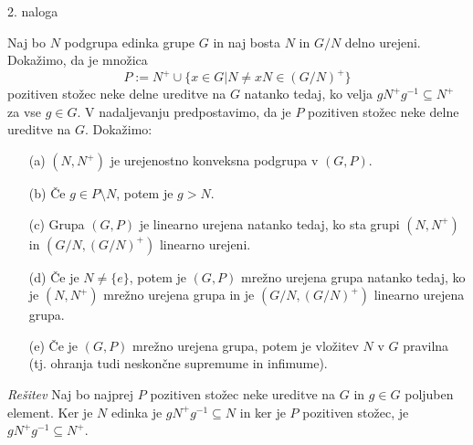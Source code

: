 \documentclass[a4paper, 12pt]{article}
\begin{document}
\begin{flushleft}
2. naloga
\end{flushleft}
Naj bo $N$ podgrupa edinka grupe $G$ in naj bosta $N$ in $G/N$ delno urejeni. Dokažimo, da je množica 
$$
P:= N^+ \cup \{x\in G | N \neq xN \in (G/N)^+ \}
$$
pozitiven stožec neke delne ureditve na $G$ natanko tedaj, ko velja $gN^+g^{-1} \subseteq N^+$ za vse $g\in G$. V nadaljevanju predpostavimo, da je $P$ pozitiven stožec neke delne ureditve na $G$. Dokažimo:
\begin{enumerate}
\item[(a)] $(N,N^+)$ je urejenostno konveksna podgrupa v $(G,P)$.
\item[(b)] Če $g\in P\setminus N$, potem je $g > N$.
\item[(c)] Grupa $(G,P)$ je linearno urejena natanko tedaj, ko sta grupi $(N,N^+)$ in $(G/N, (G/N)^+)$ linearno urejeni.
\item[(d)] Če je $N\neq \{e\}$, potem je $(G,P)$ mrežno urejena grupa natanko tedaj, ko je $(N,N^+)$ mrežno urejena grupa in je $(G/N, (G/N)^+)$ linearno urejena grupa.
\item[(e)] Če je $(G,P)$ mrežno urejena grupa, potem je vložitev $N$ v $G$ pravilna (tj. ohranja tudi neskončne supremume in infimume).
\end{enumerate}
\emph{Rešitev}
Naj bo najprej $P$ pozitiven stožec neke ureditve na $G$ in $g\in G$ poljuben element. Ker je $N$ edinka je $gN^+ g^{-1} \subseteq N$ in ker je $P$ pozitiven stožec, je $gN^+ g^{-1} \subseteq N^+$.
\end{document}
